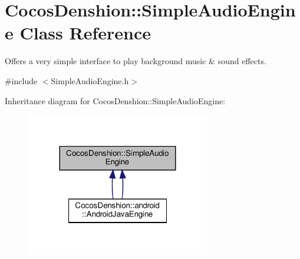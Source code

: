\hypertarget{classCocosDenshion_1_1SimpleAudioEngine}{}\section{Cocos\+Denshion\+:\+:Simple\+Audio\+Engine Class Reference}
\label{classCocosDenshion_1_1SimpleAudioEngine}


Offers a very simple interface to play background music \& sound effects.  




{\ttfamily \#include $<$Simple\+Audio\+Engine.\+h$>$}



Inheritance diagram for Cocos\+Denshion\+:\+:Simple\+Audio\+Engine\+:
\nopagebreak
\begin{figure}[H]
\begin{center}
\leavevmode
\includegraphics[width=227pt]{classCocosDenshion_1_1SimpleAudioEngine__inherit__graph}
\end{center}
\end{figure}
